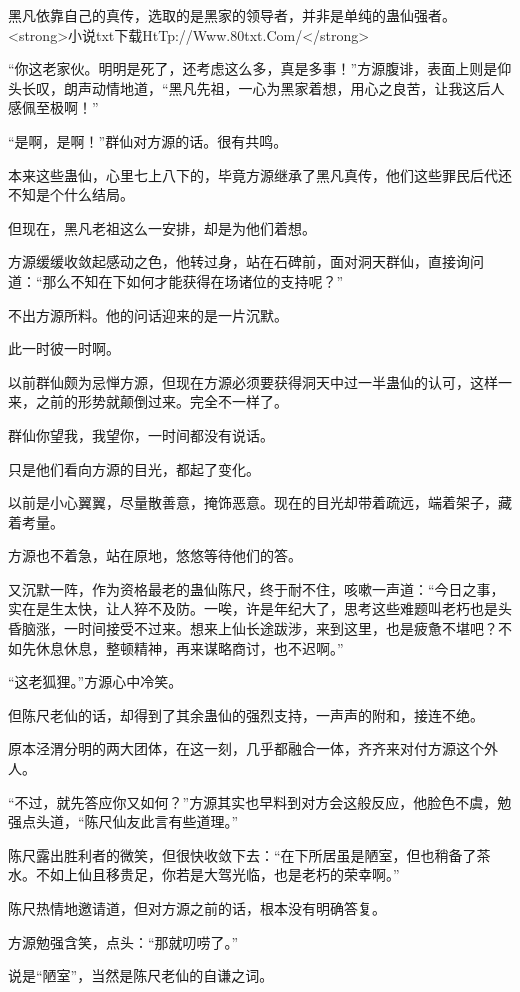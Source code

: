 \begin{this_body}
黑凡依靠自己的真传，选取的是黑家的领导者，并非是单纯的蛊仙强者。<strong>小说txt下载HtTp://Www.80txt.Com/</strong>

“你这老家伙。明明是死了，还考虑这么多，真是多事！”方源腹诽，表面上则是仰头长叹，朗声动情地道，“黑凡先祖，一心为黑家着想，用心之良苦，让我这后人感佩至极啊！”

“是啊，是啊！”群仙对方源的话。很有共鸣。

本来这些蛊仙，心里七上八下的，毕竟方源继承了黑凡真传，他们这些罪民后代还不知是个什么结局。

但现在，黑凡老祖这么一安排，却是为他们着想。

方源缓缓收敛起感动之色，他转过身，站在石碑前，面对洞天群仙，直接询问道：“那么不知在下如何才能获得在场诸位的支持呢？”

不出方源所料。他的问话迎来的是一片沉默。

此一时彼一时啊。

以前群仙颇为忌惮方源，但现在方源必须要获得洞天中过一半蛊仙的认可，这样一来，之前的形势就颠倒过来。完全不一样了。

群仙你望我，我望你，一时间都没有说话。

只是他们看向方源的目光，都起了变化。

以前是小心翼翼，尽量散善意，掩饰恶意。现在的目光却带着疏远，端着架子，藏着考量。

方源也不着急，站在原地，悠悠等待他们的答。

又沉默一阵，作为资格最老的蛊仙陈尺，终于耐不住，咳嗽一声道：“今日之事，实在是生太快，让人猝不及防。一唉，许是年纪大了，思考这些难题叫老朽也是头昏脑涨，一时间接受不过来。想来上仙长途跋涉，来到这里，也是疲惫不堪吧？不如先休息休息，整顿精神，再来谋略商讨，也不迟啊。”

“这老狐狸。”方源心中冷笑。

但陈尺老仙的话，却得到了其余蛊仙的强烈支持，一声声的附和，接连不绝。

原本泾渭分明的两大团体，在这一刻，几乎都融合一体，齐齐来对付方源这个外人。

“不过，就先答应你又如何？”方源其实也早料到对方会这般反应，他脸色不虞，勉强点头道，“陈尺仙友此言有些道理。”

陈尺露出胜利者的微笑，但很快收敛下去：“在下所居虽是陋室，但也稍备了茶水。不如上仙且移贵足，你若是大驾光临，也是老朽的荣幸啊。”

陈尺热情地邀请道，但对方源之前的话，根本没有明确答复。

方源勉强含笑，点头：“那就叨唠了。”

说是“陋室”，当然是陈尺老仙的自谦之词。


\end{this_body}

